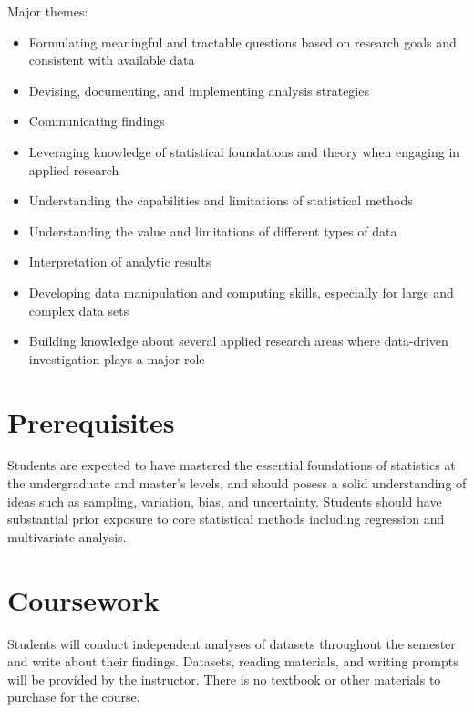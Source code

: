 \documentclass[11pt]{article}
\begin{document}
Major themes:
\begin{itemize}
	\item Formulating meaningful and tractable questions based on research goals and consistent with available data
	\item Devising, documenting, and implementing analysis strategies
	\item Communicating findings
	\item Leveraging knowledge of statistical foundations and theory when engaging in applied research
	\item Understanding the capabilities and limitations of statistical methods
	\item Understanding the value and limitations of different types of data
	\item Interpretation of analytic results
	\item Developing data manipulation and computing skills, especially for large and complex data sets
	\item Building knowledge about several applied research areas where data-driven investigation plays a major role
\end{itemize}

\section*{Prerequisites}

Students are expected to have mastered the essential foundations of statistics at the undergraduate and master’s levels, and should posess a solid understanding of ideas such as sampling, variation, bias, and uncertainty. Students should have substantial prior exposure to core statistical methods including regression and multivariate analysis.

\section*{Coursework}

Students will conduct independent analyses of datasets throughout the semester and write about their findings. Datasets, reading materials, and writing prompts will be provided by the instructor.
There is no textbook or other materials to purchase for the course.
\end{document}
